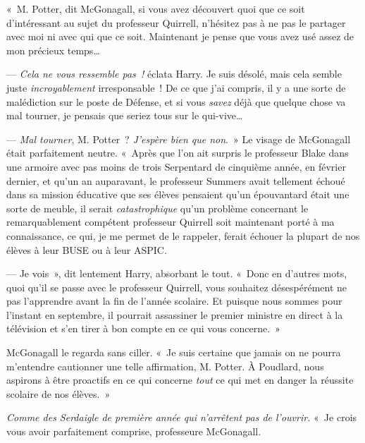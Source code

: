 «~M. Potter, dit McGonagall, si vous avez découvert quoi que ce soit d'intéressant au sujet du professeur Quirrell, n'hésitez pas à ne pas le partager avec moi ni avec qui que ce soit.
Maintenant je pense que vous avez usé assez de mon précieux temps…

--- \emph{Cela ne vous ressemble pas~!} éclata Harry.
Je suis désolé, mais cela semble juste \emph{incroyablement} irresponsable~!
De ce que j'ai compris, il y a une sorte de malédiction sur le poste de Défense, et si vous \emph{savez} déjà que quelque chose va mal tourner, je pensais que seriez tous sur le qui-vive…

--- \emph{Mal tourner}, M. Potter~? \emph{J'espère bien que non}.~»
Le visage de McGonagall était parfaitement neutre.
«~Après que l'on ait surpris le professeur Blake dans une armoire avec pas moins de trois Serpentard de cinquième année, en février dernier, et qu'un an auparavant, le professeur Summers avait tellement échoué dans sa mission éducative que ses élèves pensaient qu'un épouvantard était une sorte de meuble, il serait \emph{catastrophique} qu'un problème concernant le remarquablement compétent professeur Quirrell soit maintenant porté à ma connaissance, ce qui, je me permet de le rappeler, ferait échouer la plupart de nos élèves à leur BUSE ou à leur ASPIC.

--- Je vois~», dit lentement Harry, absorbant le tout.
«~Donc en d'autres mots, quoi qu'il se passe avec le professeur Quirrell, vous souhaitez désespérément ne pas l'apprendre avant la fin de l'année scolaire.
Et puisque nous sommes pour l'instant en septembre, il pourrait assassiner le premier ministre en direct à la télévision et s'en tirer à bon compte en ce qui vous concerne.~»

McGonagall le regarda sans ciller.
«~Je suis certaine que jamais on ne pourra m'entendre cautionner une telle affirmation, M. Potter.
À Poudlard, nous aspirons à être proactifs en ce qui concerne \emph{tout} ce qui met en danger la réussite scolaire de nos élèves.~»

\emph{Comme des Serdaigle de première année qui n'arrêtent pas de l'ouvrir.}
«~Je crois vous avoir parfaitement comprise, professeure McGonagall.

